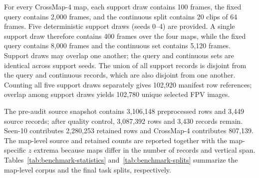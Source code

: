 For every CrossMap-4 map, each support draw contains 100 frames, the fixed
query contains 2,000 frames, and the continuous split contains 20 clips of
64 frames.  Five deterministic support draws (seeds 0--4) are provided.  A
single support draw therefore contains 400 frames over the four maps, while
the fixed query contains 8,000 frames and the continuous set contains 5,120
frames.  Support draws may overlap one another; the query and continuous
sets are identical across support seeds.  The union of all support records is
disjoint from the query and continuous records, which are also disjoint from
one another.  Counting all five support draws separately gives 102,920
manifest row references; overlap among support draws yields 102,780 unique
selected FPV images.

The pre-audit source snapshot contains 3,106,148 preprocessed rows and 3,449
source records; after quality control, 3,087,392 rows and 3,430 records
remain.  Seen-10 contributes 2,280,253 retained rows and CrossMap-4
contributes 807,139.  The map-level source and retained counts are reported
together with the map-specific $z$ extrema because maps differ in the number
of records and vertical span.
Tables~\ref{tab:benchmark-statistics} and~\ref{tab:benchmark-splits}
summarize the map-level corpus and the final task splits, respectively.

\begin{table}[t]
    \centering
    \caption{Placeholder.  The final table should make map imbalance,
    retained-corpus size, vertical calibration ranges, and radar-asset
    choices auditable.}
    \label{tab:benchmark-statistics}
\end{table}

\begin{table}[t]
    \centering
    \caption{Placeholder.  The final table should connect each split to its
    intended task and document all quotas and disjointness constraints.}
    \label{tab:benchmark-splits}
\end{table}

